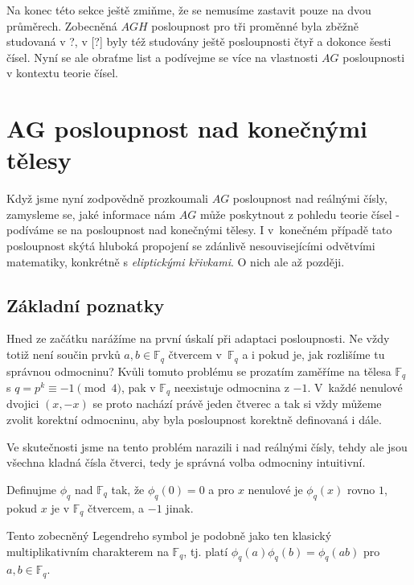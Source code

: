 \documentclass[12pt]{report}
\begin{document}
Na konec této sekce ještě zmiňme, že se nemusíme zastavit pouze na dvou průměrech. Zobecněná $AGH$ posloupnost pro tři proměnné byla zběžně studovaná v ?, v [?] byly též studovány ještě posloupnosti čtyř a dokonce šesti čísel. Nyní se ale obraťme list a podívejme se více na vlastnosti $AG$ posloupnosti v kontextu teorie čísel. 



\chapter{AG posloupnost nad konečnými tělesy}

Když jsme nyní zodpovědně prozkoumali $AG$ posloupnost nad reálnými čísly, zamysleme se, jaké informace nám $AG$ může poskytnout z pohledu teorie čísel - podíváme se na posloupnost nad konečnými tělesy. I v~konečném případě tato posloupnost skýtá hluboká propojení se zdánlivě nesouvisejícími odvětvími matematiky, konkrétně s \textit{eliptickými křivkami}. O nich ale až později.


\section{Základní poznatky}

Hned ze začátku narážíme na první úskalí při adaptaci posloupnosti. Ne vždy totiž není součin prvků $a,b \in \mathbb{F}_q$ čtvercem v~$\mathbb{F}_q$ a i pokud je, jak rozlišíme tu správnou odmocninu? Kvůli tomuto problému se prozatím zaměříme na tělesa $\mathbb{F}_q$ s $q = p^k \equiv -1 \pmod{4}$, pak v $\mathbb{F}_q$ neexistuje odmocnina z $-1$. V~každé nenulové dvojici $(x,-x)$ se proto nachází právě jeden čtverec a tak si vždy můžeme zvolit korektní odmocninu, aby byla posloupnost korektně definovaná i dále.  

\begin{poznamka}
Ve skutečnosti jsme na tento problém narazili i nad reálnými čísly, tehdy ale jsou všechna kladná čísla čtverci, tedy je správná volba odmocniny intuitivní.
\end{poznamka}

\begin{definice}
Definujme  $\phi_q$ nad $\mathbb{F}_q$ tak, že $\phi_q(0) = 0$ a pro $x$ nenulové je $\phi_q(x)$ rovno $1$, pokud $x$ je v $\mathbb{F}_q$ čtvercem,  a $-1$ jinak.
\end{definice}

Tento zobecněný Legendreho symbol je podobně jako ten klasický multiplikativním charakterem na $\mathbb{F}_q$, tj. platí $\phi_q(a)\phi_q(b)=\phi_q(ab)$ pro $a,b \in \mathbb{F}_q$.
\end{document}
